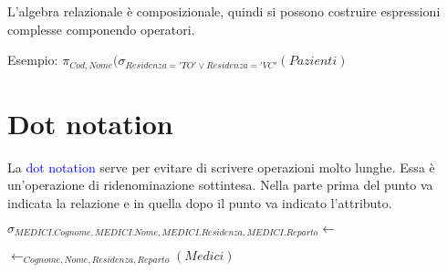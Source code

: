 L’algebra relazionale è composizionale, quindi si possono costruire espressioni complesse componendo operatori.

Esempio: $\pi_{Cod, Nome}(\sigma_{Residenza='TO' \vee Residenza='VC'}(Pazienti)$

\section{Dot notation}

La \textcolor{blue}{dot notation} serve per evitare di scrivere operazioni molto lunghe. Essa è un'operazione di ridenominazione sottintesa. Nella parte prima del punto va indicata la relazione e in quella dopo il punto va indicato l'attributo.

$\sigma_{MEDICI.Cognome,MEDICI.Nome,MEDICI.Residenza,MEDICI.Reparto} \leftarrow $

$\leftarrow_{Cognome,Nome,Residenza,Reparto}(Medici)$